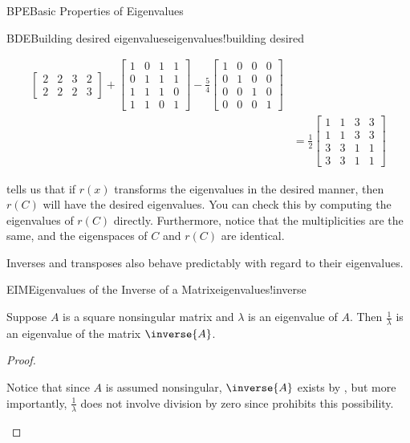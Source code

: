 \begin{subsect}{BPE}{Basic Properties of Eigenvalues}
\begin{example}{BDE}{Building desired eigenvalues}{eigenvalues!building desired}
\begin{para}
\begin{align*}
\begin{bmatrix}
2 &  2 &  3 &  2\\
2 &  2 &  2 &  3
\end{bmatrix}
+
\begin{bmatrix}
1 &  0 &  1 &  1\\
0 &  1 &  1 &  1\\
1 &  1 &  1 &  0\\
1 &  1 &  0 &  1
\end{bmatrix}
-\frac{5}{4}
\begin{bmatrix}
1 &  0 &  0 &  0\\
0 &  1 &  0 &  0\\
0 &  0 &  1 &  0\\
0 &  0 &  0 &  1
\end{bmatrix}\\
%
&=
\frac{1}{2}
\begin{bmatrix}
1 &  1 &  3 &  3\\
1 &  1 &  3 &  3\\
3 &  3 &  1 &  1\\
3 &  3 &  1 &  1
\end{bmatrix}
%
\end{align*}
\end{para}
%
\begin{para} tells us that if $r(x)$ transforms the eigenvalues in the desired manner, then $r(C)$ will have the desired eigenvalues.  You can check this by computing the eigenvalues of $r(C)$ directly.  Furthermore, notice that the multiplicities are the same, and the eigenspaces of $C$ and $r(C)$ are identical.\end{para}
\end{example}
%
\begin{para}Inverses and transposes also behave predictably with regard to their eigenvalues.\end{para}
%
\begin{theorem}{EIM}{Eigenvalues of the Inverse of a Matrix}{eigenvalues!inverse}
\begin{para}Suppose $A$ is a square nonsingular matrix and $\lambda$ is an eigenvalue of $A$.  Then $\frac{1}{\lambda}$ is an eigenvalue of the matrix $\inverse{A}$.\end{para}
\end{theorem}
%
\begin{proof}
%
\begin{para}Notice that since $A$ is assumed nonsingular, $\inverse{A}$ exists by , but more importantly, $\frac{1}{\lambda}$  does not involve division by zero since  prohibits this possibility.\end{para}

\end{proof}
\end{subsect}
